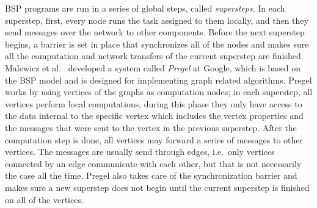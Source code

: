 \documentclass[english]{tktltiki}
\begin{document}
BSP programs are run in a series of global steps, called \textit{supersteps}. In each superstep, first, every node runs the task assigned to them locally, and then they send messages over the network to other components. Before the next superstep begins, a barrier is set in place that synchronizes all of the nodes and makes sure all the computation and network transfers of the current superstep are finished. Malewicz et al.\ \cite{malewicz10} developed a system called \textit{Pregel} at Google, which is based on the BSP model and is designed for implementing graph related algorithms. Pregel works by using vertices of the graphs as computation nodes; in each superstep, all vertices perform local computations, during this phase they only have access to the data internal to the specific vertex which includes the vertex properties and the messages that were sent to the vertex in the previous superstep. After the computation step is done, all vertices may forward a series of messages to other vertices. The messages are usually send through edges, i.e.\ only vertices connected by an edge communicate with each other, but that is not necessarily the case all the time. Pregel also takes care of the synchronization barrier and makes sure a new superstep does not begin until the current superstep is finished on all of the vertices.
\end{document}
